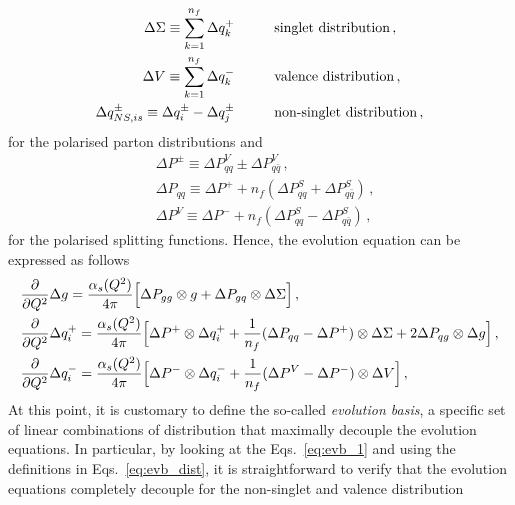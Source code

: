 \begin{equation}
  \begin{split}
     \Delta \Sigma \equiv \sum_{k=1}^{n_{f}} \Delta q_{k}^{+}  \hspace{10mm} & \T{singlet distribution}\, ,\\
     \Delta V \equiv \sum_{k=1}^{n_{f}} \Delta q_{k}^{-}  \hspace{10mm} & \T{valence distribution}\,, \\
     \Delta q_{NS,is}^{\pm} \equiv \Delta q_{i}^{\pm} - \Delta q_{j}^{\pm} \hspace{10mm} & \T{non-singlet distribution} \,,
  \end{split}
  \label{eq:evb_dist}
\end{equation}
for the polarised parton distributions and
\begin{equation}
  \begin{split}
    & \Delta P^{\pm} \equiv \Delta P_{qq}^{V} \pm \Delta P_{q \bar{q}}^{V} \,,\\
    & \Delta P_{qq} \equiv \Delta P^{+} + n_{f} (\Delta P_{qq}^{S} + \Delta P_{q\bar{q}}^{S} )  \,,\\
    & \Delta P^{V} \equiv \Delta P^{-} + n_{f} (\Delta P_{qq}^{S} - \Delta P_{q \bar{q}}^{S}) \,,
  \end{split}
\end{equation}
for the polarised splitting functions. Hence, the evolution equation can be expressed as follows
\begin{equation}
  \begin{split}
    & \frac{\partial}{\partial Q^2} \Delta g  = \frac{\alpha_{s}(Q^2)}{4 \pi} \Bigl[ \Delta P_{gg} \otimes g + \Delta P_{gq} \otimes \Delta \Sigma \Bigr] \,,\\
    & \frac{\partial}{\partial Q^2} \Delta q^{+}_{i} = \frac{\alpha_{s}(Q^2)}{4 \pi} \Bigl[ \Delta P^{+} \otimes \Delta q_{i}^{+} + \frac{1}{n_f} (\Delta P_{qq} - \Delta P^{+}) \otimes \Delta \Sigma + 2 \Delta P_{qg} \otimes \Delta g \Bigr] \,,\\
    & \frac{\partial}{\partial Q^2} \Delta q^{-}_{i} = \frac{\alpha_{s}(Q^2)}{4 \pi} \Bigl[ \Delta P^{-} \otimes \Delta q_{i}^{-} + \frac{1}{n_f} (\Delta P^{V} - \Delta P^{-}) \otimes \Delta V \Bigr] \,,\\
  \end{split}
  \label{eq:evb_1}
\end{equation}
At this point, it is customary to define the so-called \textit{evolution basis}, a specific set of linear combinations of distribution that maximally decouple the evolution equations. In particular, by looking at the Eqs.~\eqref{eq:evb_1} and using the definitions in Eqs.~\eqref{eq:evb_dist}, it is straightforward to verify that the evolution equations completely decouple for the non-singlet and valence distribution
